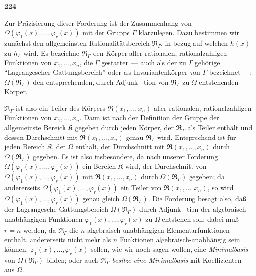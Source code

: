 \documentclass[12pt,a4paper]{article}
\begin{document}
\newpage
\begin{center}
\textbf{224}
\end{center}

Zur Pr\"azisierung dieser Forderung ist der Zusammenhang von $\Omega(\varphi_1(x), \ldots, \varphi_r(x))$ mit der Gruppe $\Gamma$ klarzulegen. Dazu bestimmen wir zun\"achst den allgemeinsten Rationalit\"atsbereich $\mathfrak{R}_{\Gamma}$, in bezug auf welchen $h(x)$ zu $h_{\Gamma}$ wird. Es bezeichne $\mathfrak{R}_{\Gamma}$ den K\"orper aller rationalen, rationalzahligen Funktionen von $x_1, \ldots, x_n$, die $\Gamma$ gestatten --- auch als der zu $\Gamma$ geh\"orige ``Lagrangescher Gattungsbereich'' oder als Invariantenk\"orper von $\Gamma$ bezeichnet ---; $\Omega(\mathfrak{R}_{\Gamma})$ den entsprechenden, durch Adjunk-\ tion von $\mathfrak{R}_{\Gamma}$ zu $\Omega$ entstehenden K\"orper.

$\mathfrak{R}_{\Gamma}$ ist also ein Teiler des K\"orpers $\mathfrak{R}(x_1, \ldots, x_n)$ aller rationalen, rationalzahligen Funktionen von $x_1, \ldots, x_n$. Dann ist nach der Definition der Gruppe der allgemeinste Bereich $\mathfrak{K}$ gegeben durch jeden K\"orper, der $\mathfrak{R}_{\Gamma}$ als Teiler enth\"alt und dessen Durchschnitt mit $\mathfrak{R}(x_1, \ldots, x_n)$ genau $\mathfrak{R}_{\Gamma}$ wird. Entsprechend ist f\"ur jeden Bereich $\mathfrak{K}$, der $\Omega$ enth\"alt, der Durchschnitt mit $\mathfrak{R}(x_1, \ldots, x_n)$ durch $\Omega(\mathfrak{R}_{\Gamma})$ gegeben. Es ist also insbesondere, da nach unserer Forderung $\Omega(\varphi_1(x), \ldots, \varphi_r(x))$ ein Bereich $\mathfrak{K}$ wird, der Durchschnitt von $\Omega(\varphi_1(x), \ldots, \varphi_r(x))$ mit $\mathfrak{R}(x_1, \ldots, x_n)$ durch $\Omega(\mathfrak{R}_{\Gamma})$ gegeben; da andererseits $\Omega(\varphi_1(x), \ldots, \varphi_r(x))$ ein Teiler von $\mathfrak{R}(x_1, \ldots, x_n)$, so wird $\Omega(\varphi_1(x), \ldots, \varphi_r(x))$ genau gleich $\Omega(\mathfrak{R}_{\Gamma})$. Die Forderung besagt also, da\ss{} der Lagrangesche Gattungsbereich $\Omega(\mathfrak{R}_{\Gamma})$ durch Adjunk-\ tion der algebraisch-unabh\"angigen Funktionen $\varphi_1(x), \ldots, \varphi_r(x)$ zu $\Omega$ entstehen soll; dabei mu\ss{} $r = n$ werden, da $\mathfrak{R}_{\Gamma}$ die $n$ algebraisch-unabh\"angigen Elementarfunktionen enth\"alt, andererseits nicht mehr als $n$ Funktionen algebraisch-unabh\"angig sein k\"onnen. $\varphi_1(x), \ldots, \varphi_r(x)$ sollen, wie wir noch sagen wollen, eine \emph{Minimalbasis} von $\Omega(\mathfrak{R}_{\Gamma})$ bilden; oder auch $\mathfrak{R}_{\Gamma}$ \emph{besitze eine Minimalbasis} mit Koeffizienten aus $\Omega$.
\end{document}
